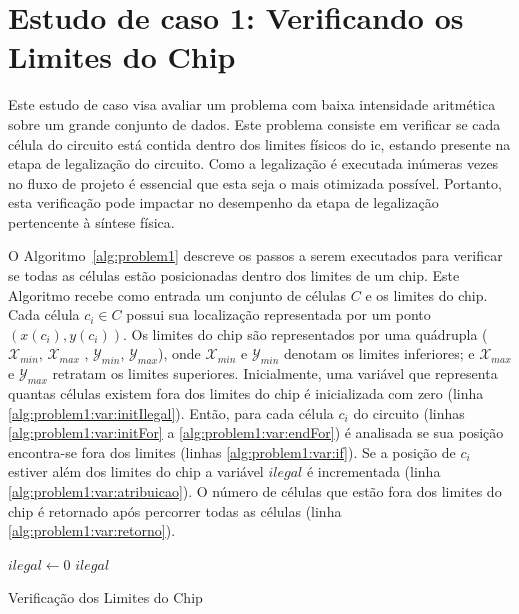 \section{Estudo de caso 1: Verificando os Limites do Chip}
\label{sec:estudo_de_caso_1}

Este estudo de caso visa avaliar um problema com baixa intensidade aritmética sobre um grande conjunto de dados.
Este problema consiste em verificar se cada célula do circuito está contida dentro dos limites físicos do \ac{ic}, estando presente na etapa de legalização do circuito.
Como a legalização é executada inúmeras vezes no fluxo de projeto é essencial que esta seja o mais otimizada possível.
Portanto, esta verificação pode impactar no desempenho da etapa de legalização pertencente à síntese física.

O Algoritmo~\ref{alg:problem1} descreve os passos a serem executados para verificar se todas as células estão posicionadas dentro dos limites de um chip.
Este Algoritmo recebe como entrada um conjunto de células $C$ e os limites do chip. 
Cada célula $c_i \in C$ possui sua localização representada por um ponto $(x(c_i), y(c_i))$.
Os limites do chip são representados por uma quádrupla ($\mathcal{X}_{min}$, $\mathcal{X}_{max}$ , $\mathcal{Y}_{min}$, $\mathcal{Y}_{max}$), onde $\mathcal{X}_{min}$ e  $\mathcal{Y}_{min}$ denotam os limites inferiores; e $\mathcal{X}_{max}$ e $\mathcal{Y}_{max}$ retratam os limites superiores.
Inicialmente, uma variável que representa quantas células existem fora dos limites do chip é inicializada com zero (linha \ref{alg:problem1:var:initIlegal}).
Então, para cada célula $c_i$ do circuito (linhas \ref{alg:problem1:var:initFor} a \ref{alg:problem1:var:endFor}) é analisada se sua posição encontra-se fora dos limites (linhas \ref{alg:problem1:var:if}).
Se a posição de $c_i$ estiver além dos limites do chip a variável $ilegal$ é incrementada (linha \ref{alg:problem1:var:atribuicao}).
O número de células que estão fora dos limites do chip é retornado após percorrer todas as células (linha \ref{alg:problem1:var:retorno}).


\begin{algorithm}[h!t]
	\LinesNumbered
    $ilegal \gets 0$\; \label{alg:problem1:var:initIlegal}
  	 \label{alg:problem1:var:endFor}
  	\Return $ilegal$\; \label{alg:problem1:var:retorno}
	\caption{Verificação dos Limites do Chip} 
	\label{alg:problem1}
\end{algorithm}

